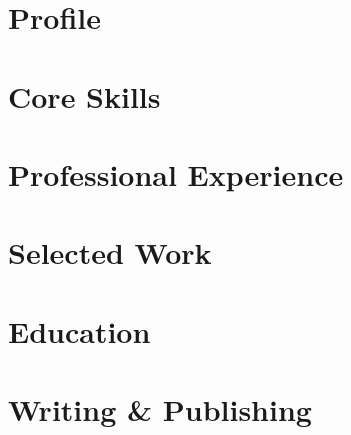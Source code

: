 \documentclass[9.5pt,a4paper]{article}
\begin{document}
\ResumeHeader

\section{Profile}


\section{Core Skills}
\ResumeSkillsTable

\section{Professional Experience}


\section{Selected Work}
\ResumeProjectsEN

\section{Education}


\section{Writing \& Publishing}

\ENOSSWritingBlock
\end{document}
